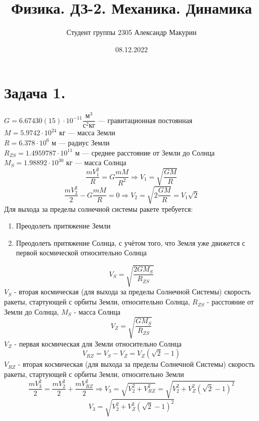 \documentclass[12pt]{article}
\title{Физика. ДЗ-2. Механика. Динамика}
\author{Студент группы 2305 Александр Макурин}
\date{08.12.2022}
\begin{document}
\maketitle

\begin{sloppypar}

    \section*{Задача 1.}
    $G = 6.67430(15) \cdot 10^{-11} \dfrac{\text{м}^3}{\text{с}^2\text{кг}}$ — гравитационная постоянная \\
    $M = 5.9742 \cdot 10^{24}$ кг — масса Земли \\
    $R = 6.378 \cdot 10^6$ м — радиус Земли \\
    $R_{ZS} = 1.4959787 \cdot 10^{11}$ м — среднее расстояние от Земли до Солнца \\
    $M_S = 1.98892 \cdot 10^{30}$ кг — масса Солнца
    \[
        \dfrac{mV_1^2}{R} = G\dfrac{mM}{R^2} \Rightarrow V_1 = \sqrt{\dfrac{GM}{R}}
    \]
    \[
        \dfrac{mV_2^2}{2} - G\dfrac{mM}{R} = 0 \Rightarrow V_2 = \sqrt{2\dfrac{GM}{R}} = V_1\sqrt2
    \]
    Для выхода за пределы солнечной системы ракете требуется:
    \begin{enumerate}
        \item{Преодолеть притяжение Земли}
        \item{Преодолеть притяжение Солнца, с учётом того, что Земля уже движется с первой космической относительно Солнца}
    \end{enumerate}
    \[
        V_S = \sqrt{\dfrac{2GM_S}{R_{ZS}}}
    \]
    $V_S$ - вторая космическая (для выхода за пределы Солнечной Системы) скорость ракеты, стартующей с орбиты Земли, относительно Солнца, $R_{ZS}$ - расстояние от Земли до Солнца, $M_S$ - масса Солнца
    \[
        V_Z = \sqrt{\dfrac{GM_S}{R_{ZS}}}
    \]
    $V_Z$ - первая космическая для Земли относительно Солнца
    \[
        V_{RZ} = V_S - V_Z = V_Z(\sqrt2 - 1)
    \]
    $V_{RZ}$ - вторая космическая (для выхода за пределы Солнечной Системы) скорость ракеты, стартующей с орбиты Земли, относительно Земли
    \[
        \dfrac{mV_3^2}{2} = \dfrac{mV_2^2}{2} + \dfrac{mV_{RZ}^2}{2} \Rightarrow V_3 = \sqrt{V_2^2 + V_{RZ}^2} = \sqrt{V_2^2 + V_Z^2(\sqrt2 - 1)^2}
    \]
    \[
        V_3 = \sqrt{V_2^2 + V_Z^2(\sqrt2 - 1)^2}
    \]


\end{sloppypar}
\end{document}
